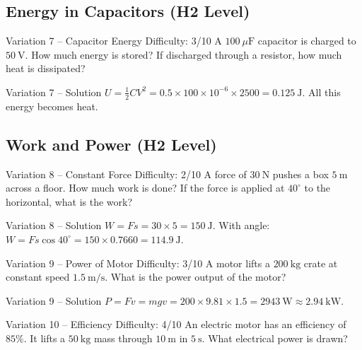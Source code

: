 \documentclass[11pt]{beamer}
\begin{document}
\subsection{Energy in Capacitors (H2 Level)}

\begin{frame}[shrink=15]{Variation 7 – Capacitor Energy \hfill Difficulty: 3/10}
A $100\ \mu\mathrm{F}$ capacitor is charged to $50\ \mathrm{V}$. How much energy is stored? If discharged through a resistor, how much heat is dissipated?
\end{frame}

\begin{frame}{Variation 7 – Solution}
$U = \frac12 CV^2 = 0.5\times100\times10^{-6}\times2500 = 0.125\ \mathrm{J}$. All this energy becomes heat.
\end{frame}

\subsection{Work and Power (H2 Level)}

\begin{frame}[shrink=15]{Variation 8 – Constant Force \hfill Difficulty: 2/10}
A force of $30\ \mathrm{N}$ pushes a box $5\ \mathrm{m}$ across a floor. How much work is done? If the force is applied at $40^\circ$ to the horizontal, what is the work?
\end{frame}

\begin{frame}{Variation 8 – Solution}
$W = Fs = 30\times5 = 150\ \mathrm{J}$. With angle: $W = Fs\cos40^\circ = 150\times0.7660 = 114.9\ \mathrm{J}$.
\end{frame}

\begin{frame}[shrink=15]{Variation 9 – Power of Motor \hfill Difficulty: 3/10}
A motor lifts a $200\ \mathrm{kg}$ crate at constant speed $1.5\ \mathrm{m/s}$. What is the power output of the motor?
\end{frame}

\begin{frame}{Variation 9 – Solution}
$P = Fv = mgv = 200\times9.81\times1.5 = 2943\ \mathrm{W} \approx 2.94\ \mathrm{kW}$.
\end{frame}

\begin{frame}[shrink=15]{Variation 10 – Efficiency \hfill Difficulty: 4/10}
An electric motor has an efficiency of $85\%$. It lifts a $50\ \mathrm{kg}$ mass through $10\ \mathrm{m}$ in $5\ \mathrm{s}$. What electrical power is drawn?
\end{frame}
\end{document}

